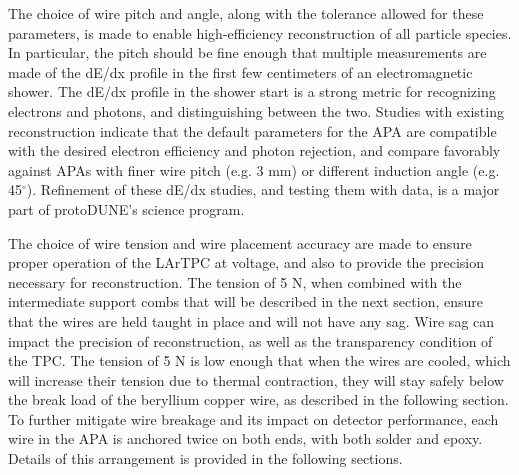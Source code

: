 The choice of wire pitch and angle, along with the tolerance allowed for these parameters, is made to enable high-efficiency reconstruction of all particle species.  In particular, the pitch should be fine enough that multiple measurements are made of the dE/dx profile in the first few centimeters of an electromagnetic shower.  The dE/dx profile in the shower start is a strong metric for recognizing electrons and photons, and distinguishing between the two.  Studies with existing reconstruction indicate that the default parameters for the APA are compatible with the desired electron efficiency and photon rejection, and compare favorably against APAs with finer wire pitch (e.g. 3 mm) or different induction angle (e.g. 45$^{\circ}$).  Refinement of these dE/dx studies, and testing them with data, is a major part of protoDUNE's science program.

The choice of wire tension and wire placement accuracy are made to ensure proper operation of the LArTPC at voltage, and also to provide the precision necessary for reconstruction.  The tension of 5 N, when combined with the intermediate support combs that will be described in the next section, ensure that the wires are held taught in place and will not have any sag.  Wire sag can impact the precision of reconstruction, as well as the transparency condition of the TPC.  The tension of 5 N is low enough that when the wires are cooled, which will increase their tension due to thermal contraction, they will stay safely below the break load of the beryllium copper wire, as described in the following section.  To further mitigate wire breakage and its impact on detector performance, each wire in the APA is anchored twice on both ends, with both solder and epoxy.  Details of this arrangement is provided in the following sections. 







